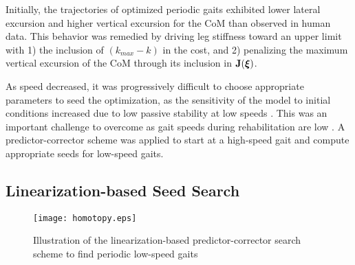 Initially, the trajectories of optimized periodic gaits exhibited lower lateral excursion and higher vertical excursion for the CoM than observed in human data. This behavior was remedied by driving leg stiffness toward an upper limit with 1) the inclusion of $ (k_{max} - k) $ in the cost, and 2) penalizing the maximum vertical excursion of the CoM through its inclusion in $\mathbf{J}(\boldsymbol{\xi})$. 

As speed decreased, it was progressively difficult to choose appropriate parameters to seed the optimization, as the sensitivity of the model to initial conditions increased due to low passive stability at low speeds \cite{kuo2001simple}. This was an important challenge to overcome as gait speeds during rehabilitation are low \cite{seethapathi2015metabolic}. A predictor-corrector scheme was applied to start at a high-speed gait and compute appropriate seeds for low-speed gaits. 

\subsection{Linearization-based Seed Search}

\begin{figure}
	\centering
	\texttt{[image: homotopy.eps]}
	\caption{Illustration of the linearization-based predictor-corrector search scheme to find periodic low-speed gaits}\label{fig:homotopy}
\end{figure}

